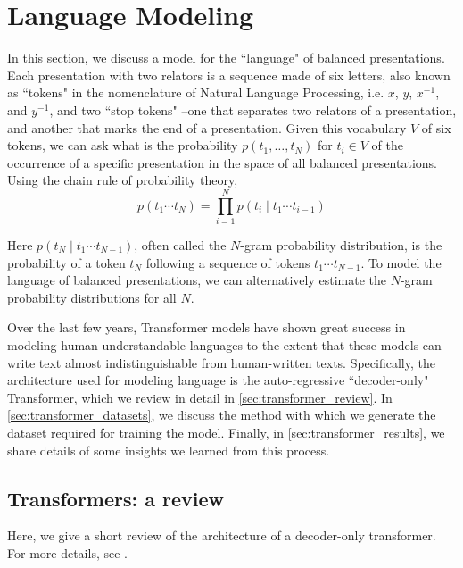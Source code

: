
\section{Language Modeling} \label{sec:lm}

In this section, we discuss a model for the ``language" of balanced presentations.
Each presentation with two relators is a sequence made of six letters, also known as ``tokens" in the nomenclature of Natural Language Processing, i.e. $x$, $y$, $x^{-1}$, and $y^{-1}$, and two ``stop tokens" --one that separates two relators of a presentation, and another that marks the end of a presentation.
Given this vocabulary $V$ of six tokens, we can ask what is the probability $p(t_1, \dots, t_N)$ for $t_i \in V$ of the occurrence of a specific presentation in the space of all balanced presentations.
Using the chain rule of probability theory,
\[
p(t_1 \cdots t_{N}) = \prod \limits_{i=1}^{N} p (t_{i} \mid t_{1} \cdots t_{i-1})
\]

Here $p (t_{N} \mid t_{1} \cdots t_{N-1})$, often called the $N$-gram probability distribution, is the probability of a token $t_N$ following a sequence of tokens $t_{1} \cdots t_{N-1}$.
To model the language of balanced presentations, we can alternatively estimate the $N$-gram probability distributions for all $N$.

Over the last few years, Transformer models have shown great success in modeling human-understandable languages to the extent that these models can write text almost indistinguishable from human-written texts.
Specifically, the architecture used for modeling language is the auto-regressive ``decoder-only" Transformer, which we review in detail in \autoref{sec:transformer_review}.
In \autoref{sec:transformer_datasets}, we discuss the method with which we generate the dataset required for training the model.
Finally, in \autoref{sec:transformer_results}, we share details of some insights we learned from this process.

\subsection{Transformers: a review\label{sec:transformer_review}}

Here, we give a short review of the architecture of a decoder-only transformer.
For more details, see \cite{vaswani2023attention, elhage2021mathematical, douglas2023large}.

